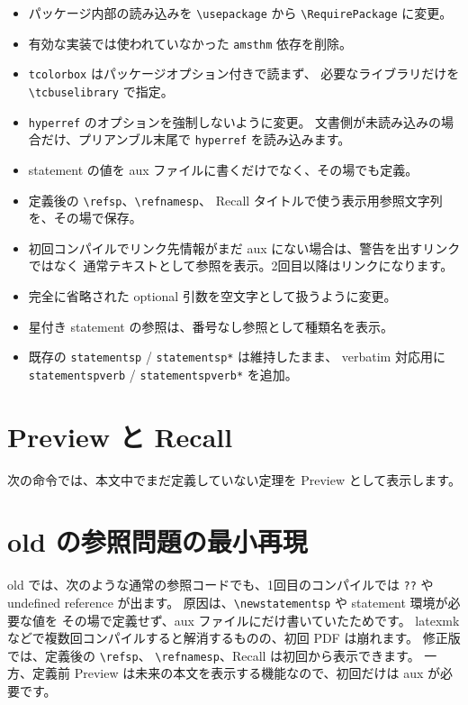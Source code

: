 \documentclass{ltjsarticle}
\begin{document}
\begin{itemize}[leftmargin=*]
\item パッケージ内部の読み込みを \texttt{\textbackslash usepackage} から
      \texttt{\textbackslash RequirePackage} に変更。
\item 有効な実装では使われていなかった \texttt{amsthm} 依存を削除。
\item \texttt{tcolorbox} はパッケージオプション付きで読まず、
      必要なライブラリだけを \texttt{\textbackslash tcbuselibrary} で指定。
\item \texttt{hyperref} のオプションを強制しないように変更。
      文書側が未読み込みの場合だけ、プリアンブル末尾で \texttt{hyperref} を読み込みます。
\item statement の値を aux ファイルに書くだけでなく、その場でも定義。
\item 定義後の \texttt{\textbackslash refsp}、\texttt{\textbackslash refnamesp}、
      Recall タイトルで使う表示用参照文字列を、その場で保存。
\item 初回コンパイルでリンク先情報がまだ aux にない場合は、警告を出すリンクではなく
      通常テキストとして参照を表示。2回目以降はリンクになります。
\item 完全に省略された optional 引数を空文字として扱うように変更。
\item 星付き statement の参照は、番号なし参照として種類名を表示。
\item 既存の \texttt{statementsp} / \texttt{statementsp*} は維持したまま、
      verbatim 対応用に \texttt{statementspverb} / \texttt{statementspverb*} を追加。
\end{itemize}

\section{Preview と Recall}

次の命令では、本文中でまだ定義していない定理を Preview として表示します。

\begin{codeblock}
\end{codeblock}


\section{old の参照問題の最小再現}

old では、次のような通常の参照コードでも、1回目のコンパイルでは
\texttt{??} や undefined reference が出ます。
原因は、\texttt{\textbackslash newstatementsp} や statement 環境が必要な値を
その場で定義せず、aux ファイルにだけ書いていたためです。
latexmk などで複数回コンパイルすると解消するものの、初回 PDF は崩れます。
修正版では、定義後の \texttt{\textbackslash refsp}、
\texttt{\textbackslash refnamesp}、Recall は初回から表示できます。
一方、定義前 Preview は未来の本文を表示する機能なので、初回だけは aux が必要です。
\end{document}
